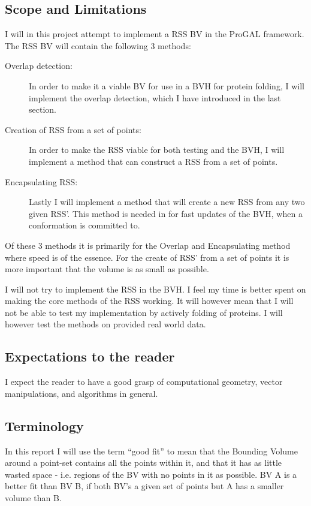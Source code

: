 \subsection{Scope and Limitations}
\label{scope}
I will in this project attempt to implement a RSS BV in the ProGAL framework. The RSS BV will contain the following 3 methods:

\begin{description}
\item[Overlap detection:] In order to make it a viable BV for use in a BVH for protein folding, I will implement the overlap detection, which I have introduced in the last section. 

\item[Creation of RSS from a set of points:] In order to make the RSS viable for both testing and the BVH, I will implement a method that can construct a RSS from a set of points.
\item[Encapsulating RSS:] Lastly I will implement a method that will create a new RSS from any two given RSS'. This method is needed in for fast updates of the BVH, when a conformation is committed to.
\end{description}

Of these 3 methods it is primarily for the Overlap and Encapsulating method where speed is of the essence. For the create of RSS' from a set of points it is more important that the volume is as small as possible.

I will not try to implement the RSS in the BVH. I feel my time is better spent on making the core methods of the RSS working. It will however mean that I will not be able to test my implementation by  actively folding of proteins. I will however test the methods on provided real world data.

\subsection{Expectations to the reader}
I expect the reader to have a good grasp of computational geometry, vector manipulations, and algorithms in general.

\subsection{Terminology}
In this report I will use the term ``good fit'' to mean that the Bounding Volume around a point-set contains all the points within it, and that it has as little wasted space - i.e. regions of the BV with no points in it as possible. BV A is a better fit than BV B, if both BV's a given set of points but A has a smaller volume than B.

